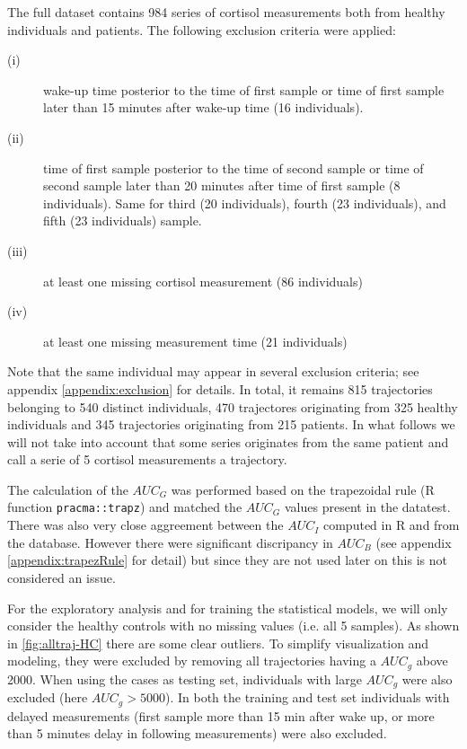 \documentclass[12pt]{article}
\begin{document}
The full dataset contains 984 series of cortisol measurements both
from healthy individuals and patients. The following exclusion
criteria were applied:
\begin{description}
\item[{(i)}] wake-up time posterior to the time of first sample or time of
first sample later than 15 minutes after wake-up time (16 individuals).
\item[{(ii)}] time of first sample posterior to the time of second sample
or time of second sample later than 20 minutes after time of
first sample (8 individuals). Same for third (20
individuals), fourth (23 individuals), and fifth (23
individuals) sample.
\item[{(iii)}] at least one missing cortisol measurement (86 individuals)
\item[{(iv)}] at least one missing measurement time (21 individuals)
\end{description}
Note that the same individual may appear in several exclusion
  criteria; see appendix \ref{appendix:exclusion} for details. In total, it
  remains 815 trajectories belonging to 540 distinct individuals, 470
  trajectores originating from 325 healthy individuals and 345
  trajectories originating from 215 patients. In what follows we will
  not take into account that some series originates from the same
  patient and call a serie of 5 cortisol measurements a trajectory.

\bigskip

The calculation of the \(AUC_G\) was performed based on the
trapezoidal rule (R function \texttt{pracma::trapz}) and matched the
\(AUC_G\) values present in the datatest. There was also very close
aggreement between the \(AUC_I\) computed in R and from the
database. However there were significant discripancy in \(AUC_B\) (see
appendix \ref{appendix:trapezRule} for detail) but since they are not used
later on this is not considered an issue.

\bigskip

For the exploratory analysis and for training the statistical models,
we will only consider the healthy controls with no missing values
(i.e. all 5 samples). As shown in \autoref{fig:alltraj-HC} there are
some clear outliers. To simplify visualization and modeling, they were
excluded by removing all trajectories having a \(AUC_g\)
above 2000. When using the cases as testing set, individuals with
large \(AUC_g\) were also excluded (here \(AUC_g>5000\)). In both the
training and test set individuals with delayed measurements (first
sample more than 15 min after wake up, or more than 5 minutes delay in
following measurements) were also excluded.
\end{document}
